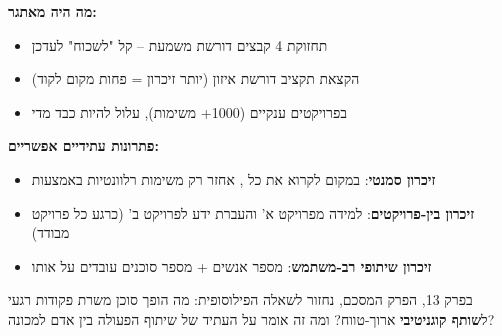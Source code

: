 \textbf{מה היה מאתגר:}
\begin{itemize}
  \item תחזוקת \num{4} קבצים דורשת משמעת – קל "לשכוח" לעדכן
  \item הקצאת תקציב  דורשת איזון (יותר זיכרון = פחות מקום לקוד)
  \item בפרויקטים ענקיים (\num{1000}+ משימות),  עלול להיות כבד מדי
\end{itemize}

\textbf{פתרונות עתידיים אפשריים:}
\begin{itemize}
  \item \textbf{זיכרון סמנטי}: במקום לקרוא את כל , אחזר רק משימות רלוונטיות באמצעות 
  \item \textbf{זיכרון בין-פרויקטים}: למידה מפרויקט א' והעברת ידע לפרויקט ב' (כרגע כל פרויקט מבודד)
  \item \textbf{זיכרון שיתופי רב-משתמש}: מספר אנשים + מספר סוכנים עובדים על אותו 
\end{itemize}

בפרק \num{13}, הפרק המסכם, נחזור לשאלה הפילוסופית: מה הופך סוכן  משרת פקודות רגעי ל\textbf{שותף קוגניטיבי} ארוך-טווח? ומה זה אומר על העתיד של שיתוף הפעולה בין אדם למכונה?
